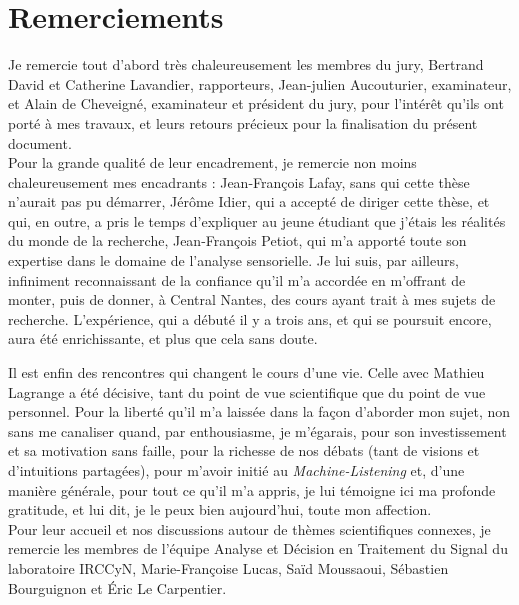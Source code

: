 
\medskip

\begingroup
\let\clearpage\relax
\let\cleardoublepage\relax
\let\cleardoublepage\relax
\chapter*{Remerciements}

Je remercie tout d'abord très chaleureusement les membres du jury, Bertrand David et Catherine Lavandier, rapporteurs, Jean-julien Aucouturier, examinateur, et Alain de Cheveigné, examinateur et président du jury, pour l’intérêt qu'ils ont porté à mes travaux, et leurs retours précieux pour la finalisation du présent document. \\

Pour la grande qualité de leur encadrement, je remercie non moins chaleureusement mes encadrants : Jean-François Lafay, sans qui cette thèse n'aurait pas pu démarrer, Jérôme Idier, qui a accepté de diriger cette thèse, et qui, en outre, a pris le temps d'expliquer au jeune étudiant que j'étais les réalités du monde de la recherche, Jean-François Petiot, qui m'a apporté toute son expertise dans le domaine de l'analyse sensorielle. Je lui suis, par ailleurs, infiniment reconnaissant de la confiance qu'il m'a accordée en m'offrant de monter, puis de donner, à Central Nantes, des cours ayant trait à mes sujets de recherche. L'expérience, qui a débuté il y a trois ans, et qui se poursuit encore, aura été enrichissante, et plus que cela sans doute. 

Il est enfin des rencontres qui changent le cours d'une vie. Celle avec Mathieu Lagrange a été décisive, tant du point de vue scientifique que du point de vue personnel. Pour la liberté qu'il m'a laissée dans la façon d'aborder mon sujet, non sans me canaliser quand, par enthousiasme, je m'égarais, pour son investissement et sa motivation sans faille, pour la richesse de nos débats (tant de visions et d'intuitions partagées), pour m'avoir initié au \textit{Machine-Listening} et, d'une manière générale, pour tout ce qu'il m'a appris, je lui témoigne ici ma profonde gratitude, et lui dit, je le peux bien aujourd'hui, toute mon affection. \\

Pour leur accueil et nos discussions autour de thèmes scientifiques connexes, je remercie les membres de l’équipe Analyse et Décision en Traitement du Signal du laboratoire IRCCyN, Marie-Françoise Lucas, Saïd Moussaoui, Sébastien Bourguignon et Éric Le Carpentier. \\

